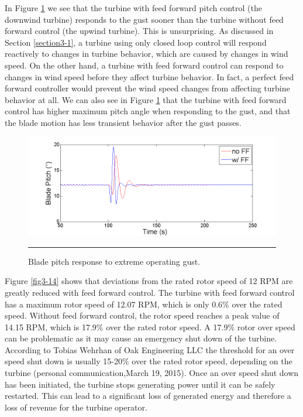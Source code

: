 In Figure \ref{fig3-13} we see that the turbine with feed forward pitch control (the downwind turbine) responds to the gust sooner than the turbine without feed forward control (the upwind turbine). This is unsurprising. As discussed in Section \ref{section3-1}, a turbine using only closed loop control will respond reactively to changes in turbine behavior, which are caused by changes in wind speed. On the other hand, a turbine with feed forward control can respond to changes in wind speed before they affect turbine behavior. In fact, a perfect feed forward controller would prevent the wind speed changes from affecting turbine behavior at all. We can also see in Figure \ref{fig3-13} that the turbine with feed forward control has  higher maximum pitch angle when responding to the gust, and that the blade motion has less transient behavior after the gust passes.

\begin{figure}[htbp]
	\centering
		\includegraphics[trim = {1cm 0 2cm 0}, clip, width = \linewidth]{Figures/ch3Figures/fig3-13.png}
		\rule{35em}{0.5pt}
	\caption{Blade pitch response to extreme operating gust. }
	\label{fig3-13}
\end{figure}

Figure \ref{fig3-14} shows that deviations from the rated rotor speed of 12 RPM are greatly reduced with feed forward control. The turbine with feed forward control has a maximum rotor speed of 12.07 RPM, which is only 0.6$\%$ over the rated speed. Without feed forward control, the rotor speed reaches a peak value of 14.15 RPM, which is 17.9$\%$ over the rated rotor speed. A 17.9$\%$ rotor over speed can be problematic as it may cause an emergency shut down of the turbine. According to Tobias Wehrhan of Oak Engineering LLC the threshold for an over speed shut down is usually 15-20$\%$ over the rated rotor speed, depending on the turbine (personal communication,March 19, 2015). Once an over speed shut down has been initiated, the turbine stops generating power until it can be safely restarted. This can lead to a significant loss of generated energy and therefore a loss of revenue for the turbine operator.

